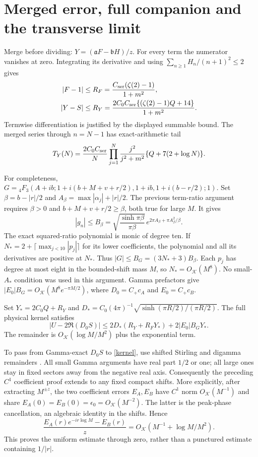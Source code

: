 \documentclass[11pt,a4paper]{article}
\newcommand{\ga}{\mathfrak a}\newcommand{\gb}{\mathfrak b}
\begin{document}
\section{Merged error, full companion and the transverse limit}
Merge before dividing: $Y=(\ga F-\gb H)/z$.
For every term the numerator vanishes at zero. Integrating its derivative
and using $\sum_{n\ge1}H_n/(n+1)^2\le2$ gives
\begin{align}
 |F-1|&\le R_F=\frac{C_{\rm ser}(\zeta(2)-1)}{1+m^2},\nonumber\\
 |Y-S|&\le R_Y=
 \frac{2C_0C_{\rm ser}\{(\zeta(2)-1)Q+14\}}{1+m^2}.
 \label{merged}
\end{align}
Termwise differentiation is justified by the displayed summable bound.
The merged series through $n=N-1$ has exact-arithmetic tail
\begin{equation}
 T_Y(N)=\frac{2C_0C_{\rm ser}}{N}
 \prod_{j=1}^N\frac{j^2}{j^2+m^2}\{Q+7(2+\log N)\}.
 \label{tailseries}
\end{equation}

For completeness, $G={}_4F_3(A+ib;1+i(b+M+v+r/2),1+ib,
1+i(b-r/2);1)$. Set $\beta=b-|r|/2$ and
$A_\beta=\max|\alpha_j|+|r|/2$. The previous term-ratio argument
requires $\beta>0$ and $b+M+v+r/2\ge\beta$, both true for large $M$.
It gives
\[
 |g_n|\le B_\beta=\sqrt{\frac{\sinh\pi\beta}{\pi\beta}}\,
       e^{2\pi A_\beta+\pi A_\beta^2/\beta}.
\]
The exact squared-ratio polynomial is monic of degree ten.
If $N_*=2+\lceil\max_{j<10}|p_j|\rceil$ for its lower coefficients,
the polynomial and all its derivatives are positive at $N_*$.
Thus $|G|\le B_G=(3N_*+3)B_\beta$.
Each $p_j$ has degree at most eight in the bounded-shift mass $M$,
so $N_*=O_{\mathcal K}(M^8)$.
No small-$A_*$ condition was used in this argument.
Gamma prefactors give $|E_0|B_G=O_{\mathcal K}(M^8e^{-\pi M/2})$,
where $D_0=C_+c_A$ and $E_0=C_+c_B$.

Set $Y_*=2C_0Q+R_Y$ and
$D_*=C_0(4\pi)^{-1}\sqrt{\sinh(\pi R/2)/(\pi R/2)}$.
The full physical kernel satisfies
\begin{equation}
 |U-2\Re(D_0S)|\le
 2D_*(R_Y+R_FY_*)+2|E_0|B_GY_* .
 \label{full}
\end{equation}
The remainder is $O_{\mathcal K}(\log M/M^2)$ plus the exponential term.

To pass from Gamma-exact $D_0S$ to \eqref{kernel}, use shifted
Stirling and digamma remainders \cite{stirling}.
All small Gamma arguments have real part $1/2$ or one; all large
ones stay in fixed sectors away from the negative real axis.
Consequently the preceding $C^1$ coefficient proof extends to any
fixed compact shifts. More explicitly, after extracting $M^{\pm z}$,
the two coefficient errors $E_A,E_B$ have $C^1$ norm $O_{\mathcal K}(M^{-1})$
and share $E_A(0)=E_B(0)=\epsilon_0=O_{\mathcal K}(M^{-2})$.
The latter is the peak-phase cancellation, an algebraic identity in
the shifts. Hence
\[
 \frac{E_A(r)e^{-ir\log M}-E_B(r)}z
 =O_{\mathcal K}(M^{-1}+\log M/M^2).
\]
This proves the uniform estimate through zero, rather than a
punctured estimate containing $1/|r|$.
\end{document}
